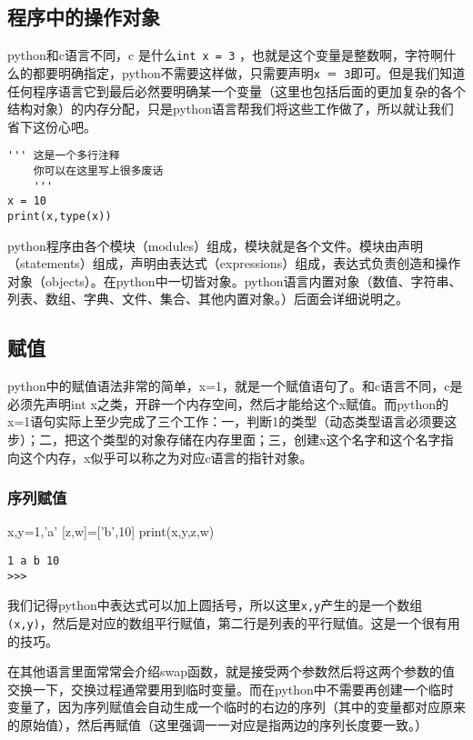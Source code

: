 \documentclass[12pt,oneside]{book}
\begin{document}
\begin{common-format}
\chapter{程序中的操作对象}
python和c语言不同，c 是什么\verb+int x = 3+ ，也就是这个变量是整数啊，字符啊什么的都要明确指定，python不需要这样做，只需要声明\verb+x ＝ 3+即可。但是我们知道任何程序语言它到最后必然要明确某一个变量（这里也包括后面的更加复杂的各个结构对象）的内存分配，只是python语言帮我们将这些工作做了，所以就让我们省下这份心吧。

\begin{Verbatim}
''' 这是一个多行注释
    你可以在这里写上很多废话
    '''
x = 10
print(x,type(x))
\end{Verbatim}

python程序由各个模块（modules）组成，模块就是各个文件。模块由声明（statements）组成，声明由表达式（expressions）组成，表达式负责创造和操作对象（objects）。在python中一切皆对象。python语言内置对象（数值、字符串、列表、数组、字典、文件、集合、其他内置对象。）后面会详细说明之。


\section{赋值}
python中的赋值语法非常的简单，x=1，就是一个赋值语句了。和c语言不同，c是必须先声明int x之类，开辟一个内存空间，然后才能给这个x赋值。而python的x=1语句实际上至少完成了三个工作：一，判断1的类型（动态类型语言必须要这步）；二，把这个类型的对象存储在内存里面；三，创建x这个名字和这个名字指向这个内存，x似乎可以称之为对应c语言的指针对象。

\subsection{序列赋值}
\begin{tcbpython}[]
x,y=1,'a'
[z,w]=['b',10]
print(x,y,z,w)
\end{tcbpython}
\begin{Verbatim}
1 a b 10
>>> 
\end{Verbatim}


我们记得python中表达式可以加上圆括号，所以这里\verb+x,y+产生的是一个数组\verb+(x,y)+，然后是对应的数组平行赋值，第二行是列表的平行赋值。这是一个很有用的技巧。

在其他语言里面常常会介绍swap函数，就是接受两个参数然后将这两个参数的值交换一下，交换过程通常要用到临时变量。而在python中不需要再创建一个临时变量了，因为序列赋值会自动生成一个临时的右边的序列（其中的变量都对应原来的原始值），然后再赋值（这里强调一一对应是指两边的序列长度要一致。）


\end{common-format}
\end{document}
